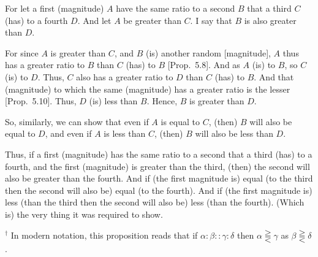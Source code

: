 \begin{Parallel}{}{}
{For let a first (magnitude) $A$ have the same ratio to a second $B$  that a
third $C$ (has) to a fourth $D$. And let $A$ be greater than $C$. I say that $B$
is also greater than $D$.

For since $A$ is greater than $C$, and $B$ (is) another random [magnitude],
$A$ thus has a greater ratio to $B$ than $C$ (has) to $B$ [Prop.~5.8]. And as $A$ (is) to $B$, so $C$ (is) to
$D$. Thus, $C$ also has a greater ratio to $D$ than $C$ (has) to $B$. And that (magnitude) to
which the same (magnitude) has a greater ratio is the lesser
 [Prop.~5.10]. Thus, $D$
(is) less than $B$. Hence, $B$ is greater than $D$.

So, similarly, we can show that even if $A$ is equal to $C$, (then) $B$ will also be equal to $D$, and even if $A$ is less than $C$, (then) $B$ will also be less than $D$.

Thus, if a first (magnitude) has the same ratio to a second  that a third (has) to a fourth, and the first (magnitude) is greater than the third,
(then) the second will also be greater than the fourth. And if (the first magnitude is) equal
(to the third then the second will also be) equal (to the fourth). And
if (the first magnitude  is) less (than the third then the second will also be) less (than the fourth). (Which is) the very thing it was required to show.}
\end{Parallel}
{\footnotesize \noindent$^\dag$ In modern notation, this proposition
reads that if $\alpha:\beta::\gamma:\delta$ then $\alpha \gtreqqless \gamma$ as
$\beta\gtreqqless\delta$.}

